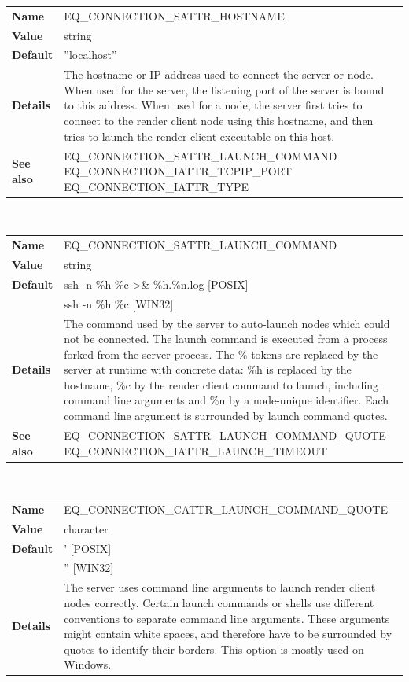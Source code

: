 \documentclass[10pt,a4]{scrartcl}
\begin{document}
\begin{center}
\begin{tabularx}{\textwidth}{|l|X|}
  \hline
  \textbf{Name} & EQ\_CONNECTION\_SATTR\_HOSTNAME\\
  \textbf{Value} & string\\
  \textbf{Default} & ''localhost''\\
  \textbf{Details} & The hostname or IP address used to connect the
  server or node. When used for the server, the listening port of the
  server is bound to this address. When used for a node, the server
  first tries to connect to the render client node using this hostname,
  and then tries to launch the render client executable on this host.\\
  \textbf{See also} & EQ\_CONNECTION\_SATTR\_LAUNCH\_COMMAND
  EQ\_CONNECTION\_IATTR\_TCPIP\_PORT EQ\_CONNECTION\_IATTR\_TYPE\\
  \hline
\end{tabularx}\\\vfill

\begin{tabularx}{\textwidth}{|l|X|}
  \hline
  \textbf{Name} & EQ\_CONNECTION\_SATTR\_LAUNCH\_COMMAND\\
  \textbf{Value} & string\\
  \textbf{Default} & ssh -n \%h \%c \textgreater\& \%h.\%n.log [POSIX]\\
                   & ssh -n \%h \%c [WIN32]\\
  \textbf{Details} & The command used by the server to auto-launch nodes
  which could not be connected. The launch command is executed from a
  process forked from the server process. The \% tokens are replaced by
  the server at runtime with concrete data: \%h is replaced by the
  hostname, \%c by the render client command to launch, including command line
  arguments and \%n by a node-unique identifier. Each command line
  argument is surrounded by launch command quotes.\\
  \textbf{See also} & EQ\_CONNECTION\_SATTR\_LAUNCH\_COMMAND\_QUOTE 
  EQ\_CONNECTION\_IATTR\_LAUNCH\_TIMEOUT\\
  \hline
\end{tabularx}\\\vfill

\begin{tabularx}{\textwidth}{|l|X|}
  \hline
  \textbf{Name} & EQ\_CONNECTION\_CATTR\_LAUNCH\_COMMAND\_QUOTE\\
  \textbf{Value} & character\\
  \textbf{Default} & ' [POSIX]\\
                   & '' [WIN32]\\
  \textbf{Details} & The server uses command line arguments to launch
  render client nodes correctly. Certain launch commands or shells use
  different conventions to separate command line arguments. These
  arguments might contain white spaces, and therefore have to be
  surrounded by quotes to identify their borders. This option is mostly
  used on Windows.\\
  \hline
\end{tabularx}\\\vfill


\end{center}
\end{document}
